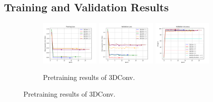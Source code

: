 \documentclass[./main.tex]{subfiles}
\begin{document}
\subsection{Training and Validation Results}
\label{subsec:pretrain_train_val_res}
\begin{figure}[htbp]
    \centering
     \begin{subfigure}[b]{\textwidth}
         \centering
         \includegraphics[width=0.32\textwidth]{./entities/pretrained/baseline/train_losses.png}
         \includegraphics[width=0.32\textwidth]{./entities/pretrained/baseline/val_losses.png}
         \includegraphics[width=0.32\textwidth]{./entities/pretrained/baseline/val_accs.png}
         \caption{Pretraining results of 3DConv.}
     \end{subfigure}
    \hfill


\end{figure}
\end{document}
